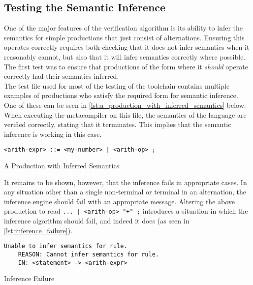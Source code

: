 \subsection{Testing the Semantic Inference} %
\label{sub:testing_the_semantic_inference}
One of the major features of the verification algorithm is its ability to infer the semantics for simple productions that just consist of alternations. 
Ensuring this operates correctly requires both checking that it does not infer semantics when it reasonably cannot, but also that it will infer semantics correctly where possible.
The first test was to ensure that productions of the form where it \textit{should} operate correctly had their semantics inferred. \\

The test file used for most of the testing of the toolchain contains multiple examples of productions who satisfy the required form for semantic inference. 
One of these can be seen in \autoref{lst:a_production_with_inferred_semantics} below. 
When executing the metacompiler on this file, the semantics of the language are verified correctly, stating that it terminates.
This implies that the semantic inference is working in this case. 

\begin{listing}[!htb]
\begin{verbatim}
<arith-expr> ::= <my-number> | <arith-op> ;
\end{verbatim}
\caption{A Production with Inferred Semantics}
\label{lst:a_production_with_inferred_semantics}
\end{listing}

It remains to be shown, however, that the inference fails in appropriate cases.
In any situation other than a single non-terminal or terminal in an alternation, the inference engine should fail with an appropriate message. 
Altering the above production to read \texttt{... | <arith-op> "+" ;} introduces a situation in which the inference algorithm should fail, and indeed it does (as seen in \autoref{lst:inference_failure}).

\begin{listing}[!htb]
\begin{verbatim}
Unable to infer semantics for rule.
    REASON: Cannot infer semantics for rule.
    IN: <statement> -> <arith-expr>
\end{verbatim}
\caption{Inference Failure}
\label{lst:inference_failure}
\end{listing}

